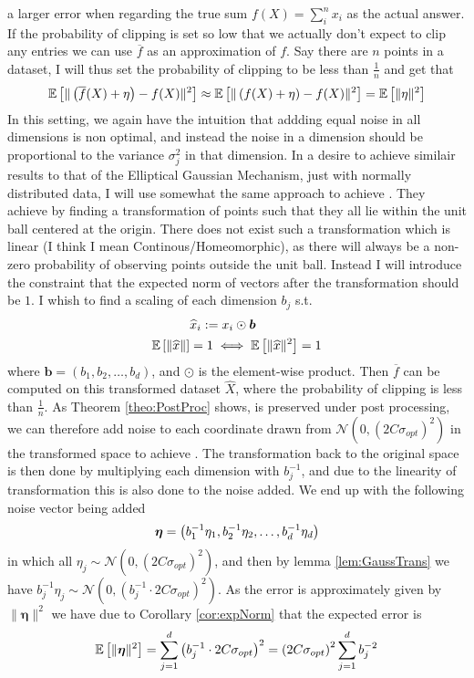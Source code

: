 \documentclass[a4paper,12pt]{article}
\begin{document}
a larger error when regarding the true sum
$f(X) = \sum_i^n x_i$ as the actual answer. If the probability of clipping is set
so low that we actually don't expect to clip any entries we can use $\overline{f}$ as an approximation of $f$.
Say there are $n$ points in a dataset, I will thus set the probability of clipping to be less than $\frac{1}{n}$ and get that
\[
    \mathbb{E} \left [ \| \left (\overline{f}(X) + \eta\right) - f(X) \|^2 \right] \approx \mathbb{E} \left [ \| \left (f(X) + \eta\right) - f(X) \|^2 \right] = \mathbb{E} \left [ \| \eta \|^2 \right]
\]
In this setting, we again have the intuition that addding equal noise in all dimensions is non optimal, and instead the noise in a dimension should be proportional
to the variance $\sigma_j^2$ in that dimension. In a desire to achieve similair results to that of the Elliptical Gaussian Mechanism, just with normally distributed data,
I will use somewhat the same approach to achieve \edp.
They achieve \edp by finding a transformation of points such that they all lie within the unit ball centered at the origin. 
There does not exist such a transformation which is linear (I think I mean Continous/Homeomorphic), as there will always be a non-zero 
probability of observing points outside the unit ball.
Instead I will introduce the constraint that the expected norm of vectors after the transformation should be $1$. 
I whish to find a scaling of each dimension $b_j$ s.t.
\begin{align}
    &\widehat{x}_i := x_i \odot \bm{b} \\
\label{eq:Alg3Con}
    \mathbb{E} \left [ \| \widehat{x} \|  \right] &= 1  \iff \mathbb{E} \left [ \| \widehat{x} \|^2 \right] = 1
\end{align}
where $\bm{b} = (b_1, b_2, \dots, b_d)$, and $\odot$ is the element-wise product. 
Then $\overline{f}$ can be computed on this transformed dataset $\widehat{X}$, where the probability of clipping is less than $\frac{1}{n}$.
As Theorem \ref{theo:PostProc} shows, \edp is preserved under post processing, 
we can therefore add noise to each coordinate drawn from $\mathcal{N}(0,(2C\sigma_{opt})^2)$ in the transformed space to achieve \edp.
The transformation back to the original space is then done by multiplying each dimension with $b_j^{-1}$, and due to the linearity of transformation 
this is also done to the noise added.
We end up with the following noise vector being added
\[
    \bm{\eta} = \left ( b_1^{-1}\eta_1, b_2^{-1}\eta_2, \dots, b_d^{-1}\eta_d \right)
\]
in which all $\eta_j \sim \mathcal{N}(0,(2C\sigma_{opt})^2)$, and then by lemma \ref{lem:GaussTrans} we have $b_j^{-1}\eta_j \sim \mathcal{N}(0, (b_j^{-1} \cdot 2C\sigma_{opt})^2)$.
As the error is approximately given by $\| \bm{\eta} \|^2$ we have due to Corollary \ref{cor:expNorm} that the expected error is 
\begin{equation}
\label{eq:Alg3Err}
    \mathbb{E} \left [ \| \bm{\eta} \|^2 \right] = \sum_{j=1}^d \left (b_j^{-1} \cdot 2C\sigma_{opt}\right)^2   = \left (2C\sigma_{opt}\right)^2 \sum_{j=1}^d b_j^{-2}
\end{equation}
\end{document}
